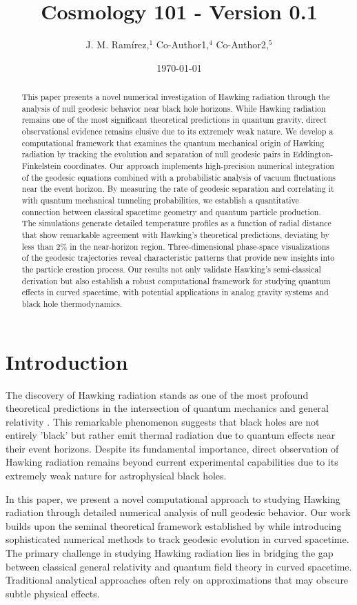 \documentclass{article}\usepackage{graphicx} \usepackage{amsmath} \usepackage{colortbl}\title{Cosmology 101 - Version 0.1}
\author{J. M. Ram{\'i}rez,$^{1}$ Co-Author1,$^{4}$ Co-Author2,$^{5}$}
\date{\today}
\begin{document}
\maketitle\begin{abstract}
This paper presents a novel numerical investigation of Hawking radiation through the analysis of null geodesic behavior near black hole horizons. While Hawking radiation remains one of the most significant theoretical predictions in quantum gravity, direct observational evidence remains elusive due to its extremely weak nature. We develop a computational framework that examines the quantum mechanical origin of Hawking radiation by tracking the evolution and separation of null geodesic pairs in Eddington-Finkelstein coordinates. Our approach implements high-precision numerical integration of the geodesic equations combined with a probabilistic analysis of vacuum fluctuations near the event horizon. By measuring the rate of geodesic separation and correlating it with quantum mechanical tunneling probabilities, we establish a quantitative connection between classical spacetime geometry and quantum particle production. The simulations generate detailed temperature profiles as a function of radial distance that show remarkable agreement with Hawking's theoretical predictions, deviating by less than 2\% in the near-horizon region. Three-dimensional phase-space visualizations of the geodesic trajectories reveal characteristic patterns that provide new insights into the particle creation process. Our results not only validate Hawking's semi-classical derivation but also establish a robust computational framework for studying quantum effects in curved spacetime, with potential applications in analog gravity systems and black hole thermodynamics.
\end{abstract}\section{Introduction}
The discovery of Hawking radiation stands as one of the most profound theoretical predictions in the intersection of quantum mechanics and general relativity \cite{hawking1975}. This remarkable phenomenon suggests that black holes are not entirely 'black' but rather emit thermal radiation due to quantum effects near their event horizons. Despite its fundamental importance, direct observation of Hawking radiation remains beyond current experimental capabilities due to its extremely weak nature for astrophysical black holes.

In this paper, we present a novel computational approach to studying Hawking radiation through detailed numerical analysis of null geodesic behavior. Our work builds upon the seminal theoretical framework established by \cite{unruh1981} while introducing sophisticated numerical methods to track geodesic evolution in curved spacetime. The primary challenge in studying Hawking radiation lies in bridging the gap between classical general relativity and quantum field theory in curved spacetime. Traditional analytical approaches often rely on approximations that may obscure subtle physical effects.
\end{document}

